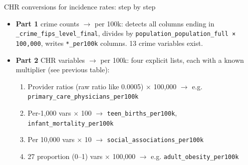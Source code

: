 \documentclass[aspectratio=169]{beamer}
\begin{document}
\begin{frame}{CHR conversions for incidence rates: step by step}
    \begin{itemize}
    \item \textbf{Part 1} crime counts $\rightarrow$ per 100k: detects all columns ending in \texttt{\_crime\_fips\_level\_final}, divides by \texttt{population\_population\_full × 100,000}, writes \texttt{*\_per100k} columns. 13 crime variables exist.  
    \item \textbf{Part 2} CHR variables $\rightarrow$ per 100k: four explicit lists, each with a known multiplier (see previous table):
    \begin{enumerate}
        \item Provider ratios (raw ratio like 0.0005) × 100,000 $\rightarrow$ e.g. \texttt{primary\_care\_physicians\_per100k}
        
        \item Per-1,000 vars $\times$ 100 $\rightarrow$ \texttt{teen\_births\_per100k}, \texttt{infant\_mortality\_per100k}
        
        \item Per 10,000 vars $\times$ 10 $\rightarrow$ \texttt{social\_associations\_per100k}
        
        \item 27 proportion (0–1) vars $\times$ 100,000 $\rightarrow$ e.g. \texttt{adult\_obesity\_per100k} 
    \end{enumerate}
\end{itemize}   
\end{frame}
\end{document}
